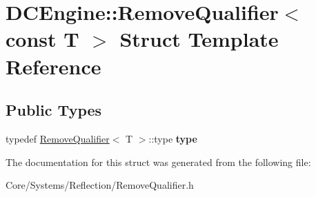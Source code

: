 \hypertarget{structDCEngine_1_1RemoveQualifier_3_01const_01T_01_4}{\section{D\-C\-Engine\-:\-:Remove\-Qualifier$<$ const T $>$ Struct Template Reference}
\label{structDCEngine_1_1RemoveQualifier_3_01const_01T_01_4}
}
\subsection*{Public Types}
\begin{DoxyCompactItemize}
\item 
\hypertarget{structDCEngine_1_1RemoveQualifier_3_01const_01T_01_4_a20b6932da95dee6f864d5d0153e1a7f9}{typedef \hyperlink{structDCEngine_1_1RemoveQualifier}{Remove\-Qualifier}$<$ T $>$\-::type {\bfseries type}}\label{structDCEngine_1_1RemoveQualifier_3_01const_01T_01_4_a20b6932da95dee6f864d5d0153e1a7f9}

\end{DoxyCompactItemize}


The documentation for this struct was generated from the following file\-:\begin{DoxyCompactItemize}
\item 
Core/\-Systems/\-Reflection/Remove\-Qualifier.\-h\end{DoxyCompactItemize}
